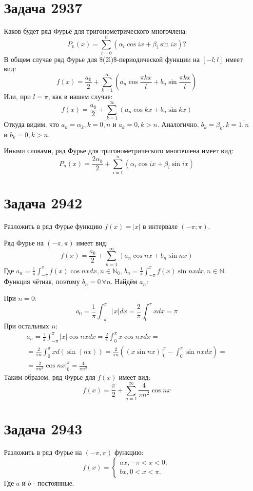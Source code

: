 \documentclass[11pt]{article}
\begin{document}
\section{Задача 2937}
\label{sec:orgcd3a7b2}
Каков будет ряд Фурье для тригонометрического многочлена:
$$P_n(x) = \sum_{i = 0}^n(\alpha_i\cos ix + \beta_i\sin ix)?$$
В общем случае ряд Фурье для \$(2l)\$-периодической функции на \([-l; l]\) имеет вид:
$$f(x) = \frac{a_0}{2} + \sum_{k = 1}^{\infty}(a_n\cos\frac{\pi k x}{l} + b_n\sin\frac{\pi k x}{l})$$
Или, при \(l = \pi\), как в нашем случае:
$$f(x) = \frac{a_0}{2} + \sum_{k = 1}^{\infty}(a_n\cos kx + b_n\sin kx)$$
Откуда видим, что \(a_k = \alpha_k, k = \overline{0, n}\) и \(a_k = 0, k > n\). Аналогично, \(b_k = \beta_k,
k = \overline{1, n}\) и \(b_k = 0, k > n\).

Иными словами, ряд Фурье для тригонометрического многочлена имеет вид:
$$P_n(x) = \frac{2\alpha_0}{2} + \sum_{i=1}^n(\alpha_i\cos ix + \beta_i\sin ix)$$
\section{Задача 2942}
\label{sec:org79d56aa}
Разложить в ряд Фурье функцию \(f(x) = |x|\) в интервале \((-\pi; \pi)\).

Ряд Фурье на \((-\pi, \pi)\) имеет вид:
$$f(x) = \frac{a_0}{2} + \sum_{n = 1}^{\infty}(a_n\cos nx + b_n\sin nx)$$
Где \(a_n = \frac{1}\pi\int_{-\pi}^\pi f(x)\cos nxdx, n \in \mathbb{N}_0\),
\(b_n = \frac{1}\pi\int_{-\pi}^\pi f(x)\sin nxdx, n \in \mathbb{N}\).
Функция чётная, поэтому \(b_n = 0\, \forall n\). Найдём \(a_n\):

При \(n = 0\):
$$a_0 = \frac{1}\pi\int_{-\pi}^\pi |x|dx = \frac{2}\pi\int_0^\pi xdx = \pi$$
При остальных \(n\):
\begin{multline*}
a_n = \frac{1}\pi\int_{-\pi}^\pi |x|\cos nx dx = \frac{2}\pi\int_0^\pi x\cos nx dx = \\
 = \frac{2}{\pi n}\int_0^\pi xd(\sin(nx)) = \frac{2}{\pi n}\left((x\sin nx)\bigg|_0^\pi - \int_0^\pi\sin nxdx\right) = \\
 = \frac{2}{\pi n^2}\cos nx\bigg|_0^\pi = \frac{4}{\pi n^2}
\end{multline*}
Таким образом, ряд Фурье для \(f(x)\) имеет вид:
$$f(x) = \frac{\pi}{2} + \sum_{n = 1}^\infty\frac{4}{\pi n^2}\cos nx$$
\section{Задача 2943}
\label{sec:orgc583f24}
Разложить в ряд Фурье на \((-\pi, \pi)\) функцию:
\begin{equation*}
f(x) = \begin{cases}
ax, -\pi < x < 0;\\
bx, 0 < x < \pi.
\end{cases}
\end{equation*}
Где \(a\) и \(b\) - постоянные.
\end{document}
